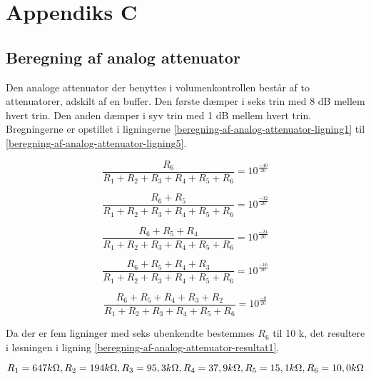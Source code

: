 \chapter{Appendiks C}
\label{beregning-af-analog-attenuator}
\section*{Beregning af analog attenuator}

Den analoge attenuator der benyttes i volumenkontrollen består af to attenuatorer, adskilt af en buffer. Den første dæmper i seks trin med 8 dB mellem hvert trin. Den anden dæmper i syv trin med 1 dB mellem hvert trin. Bregningerne er opstillet i ligningerne \ref{beregning-af-analog-attenuator-ligning1} til \ref{beregning-af-analog-attenuator-ligning5}.

\begin{equation}
\label{beregning-af-analog-attenuator-ligning1}
\frac{R_6}{R_1 + R_2 + R_3 + R_4 + R_5 + R_6} = 10^{\frac{-40}{20}}
\end{equation}

\begin{equation}
\frac{R_6 + R_5}{R_1 + R_2 + R_3 + R_4 + R_5 + R_6} = 10^{\frac{-32}{20}}
\end{equation}

\begin{equation}
\frac{R_6 + R_5 + R_4}{R_1 + R_2 + R_3 + R_4 + R_5 + R_6} = 10^{\frac{-24}{20}}
\end{equation}

\begin{equation}
\frac{R_6 + R_5 + R_4 + R_3}{R_1 + R_2 + R_3 + R_4 + R_5 + R_6} = 10^{\frac{-16}{20}}
\end{equation}

\begin{equation}
\label{beregning-af-analog-attenuator-ligning5}
\frac{R_6 + R_5 + R_4 + R_3 + R_2}{R_1 + R_2 + R_3 + R_4 + R_5 + R_6} = 10^{\frac{-8}{20}}
\end{equation}

Da der er fem ligninger med seks ubenkendte bestemmes $R_6$ til 10 k\ohm, det resultere i løsningen i ligning \ref{beregning-af-analog-attenuator-resultat1}.

\begin{equation}
\label{beregning-af-analog-attenuator-resultat1}
R_1 = 647 k\ohm, R_2 = 194 k\ohm, R_3 = 95,3 k\ohm, R_4 = 37,9 k\ohm, R_5 = 15,1  k\ohm, R_6 = 10,0 k\ohm
\end{equation}